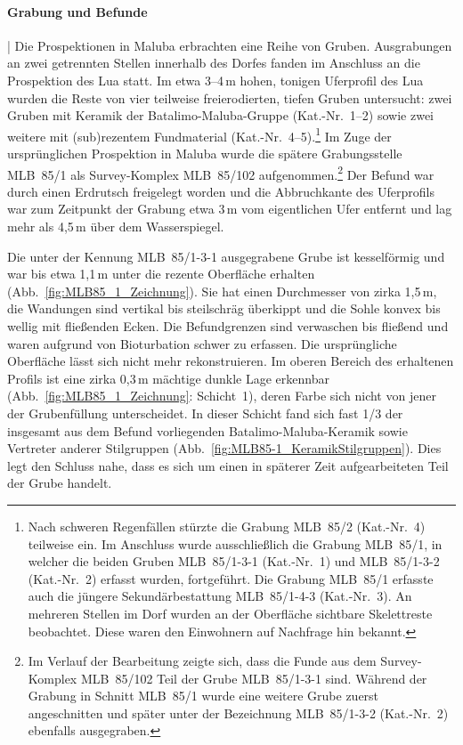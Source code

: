 \paragraph{Grabung und Befunde}\hspace{-.5em}|\hspace{.5em}%
Die Prospektionen in Maluba erbrachten eine Reihe von Gruben. Ausgrabungen an zwei getrennten Stellen innerhalb des Dorfes fanden im Anschluss an die Prospektion des Lua statt. Im etwa 3--4\,m hohen, tonigen Uferprofil des Lua wurden die Reste von vier teilweise freierodierten, tiefen Gruben untersucht: zwei Gruben mit Keramik der Batalimo-Maluba-Gruppe (Kat.-Nr.~1--2) sowie zwei weitere mit (sub)rezentem Fundmaterial (Kat.-Nr.~4--5).\footnote{Nach schweren Regenfällen stürzte die Grabung MLB~85/2 (Kat.-Nr.~4) teilweise ein. Im Anschluss wurde ausschließlich die Grabung MLB~85/1, in welcher die beiden Gruben MLB~85/1-3-1 (Kat.-Nr.~1) und MLB~85/1-3-2 (Kat.-Nr.~2) erfasst wurden, fortgeführt. Die Grabung MLB~85/1 erfasste auch die jüngere Sekundärbestattung MLB~85/1-4-3 (Kat.-Nr.~3). An mehreren Stellen im Dorf wurden an der Oberfläche sichtbare Skelettreste beobachtet. Diese waren den Einwohnern auf Nachfrage hin bekannt.} Im Zuge der ursprünglichen Prospektion in Maluba wurde die spätere Grabungsstelle MLB~85/1 als Survey-Komplex MLB~85/102 aufgenommen.\footnote{Im Verlauf der Bearbeitung zeigte sich, dass die Funde aus dem Survey-Komplex MLB~85/102 Teil der Grube MLB~85/1-3-1 sind. Während der Grabung in Schnitt MLB~85/1 wurde eine weitere Grube zuerst angeschnitten und später unter der Bezeichnung MLB~85/1-3-2 (Kat.-Nr.~2) ebenfalls ausgegraben.} Der Befund war durch einen Erdrutsch freigelegt worden und die Abbruchkante des Uferprofils war zum Zeitpunkt der Grabung etwa 3\,m vom eigentlichen Ufer entfernt und lag mehr als 4,5\,m über dem Wasserspiegel.

Die unter der Kennung MLB~85/1-3-1 ausgegrabene Grube ist kesselförmig und war bis etwa 1,1\,m unter die rezente Oberfläche erhalten (Abb.~\ref{fig:MLB85_1_Zeichnung}). Sie hat einen Durchmesser von zirka 1,5\,m, die Wandungen sind vertikal bis steilschräg überkippt und die Sohle konvex bis wellig mit fließenden Ecken. Die Befundgrenzen sind verwaschen bis fließend und waren aufgrund von Bioturbation schwer zu erfassen. Die ursprüngliche Oberfläche lässt sich nicht mehr rekonstruieren. Im oberen Bereich des erhaltenen Profils ist eine zirka 0,3\,m mächtige dunkle Lage erkennbar (Abb.~\ref{fig:MLB85_1_Zeichnung}: Schicht~1), deren Farbe sich nicht von jener der Grubenfüllung unterscheidet. In dieser Schicht fand sich fast 1/3 der insgesamt aus dem Befund vorliegenden Batalimo-Maluba-Keramik sowie Vertreter anderer Stilgruppen (Abb.~\ref{fig:MLB85-1_KeramikStilgruppen}). Dies legt den Schluss nahe, dass es sich um einen in späterer Zeit aufgearbeiteten Teil der Grube handelt.

